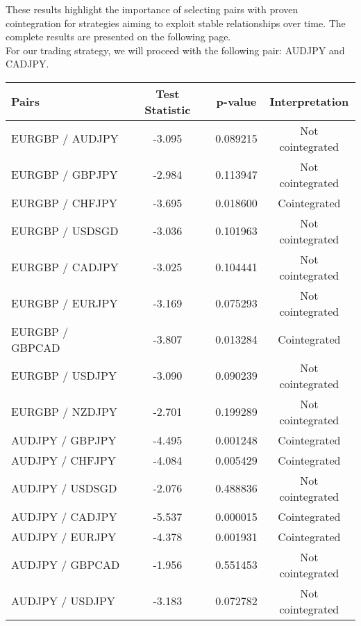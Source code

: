 \documentclass{article}
\begin{document}
These results highlight the importance of selecting pairs with proven cointegration for strategies aiming to exploit stable relationships over time. The complete results are presented on the following page.\\

For our trading strategy, we will proceed with the following pair: AUDJPY and CADJPY.


\begin{table}[h!]
    \centering
    \begin{tabular}{|l|c|c|c|}
        \hline
        \textbf{Pairs} & \textbf{Test Statistic} & \textbf{p-value} & \textbf{Interpretation} \\
        \hline
        EURGBP / AUDJPY & -3.095 & 0.089215 & Not cointegrated \\
        \hline
        EURGBP / GBPJPY & -2.984 & 0.113947 & Not cointegrated \\
        \hline
        EURGBP / CHFJPY & -3.695 & 0.018600 & Cointegrated \\
        \hline
        EURGBP / USDSGD & -3.036 & 0.101963 & Not cointegrated \\
        \hline
        EURGBP / CADJPY & -3.025 & 0.104441 & Not cointegrated \\
        \hline
        EURGBP / EURJPY & -3.169 & 0.075293 & Not cointegrated \\
        \hline
        EURGBP / GBPCAD & -3.807 & 0.013284 & Cointegrated \\
        \hline
        EURGBP / USDJPY & -3.090 & 0.090239 & Not cointegrated \\
        \hline
        EURGBP / NZDJPY & -2.701 & 0.199289 & Not cointegrated \\
        \hline
        AUDJPY / GBPJPY & -4.495 & 0.001248 & Cointegrated \\
        \hline
        AUDJPY / CHFJPY & -4.084 & 0.005429 & Cointegrated \\
        \hline
        AUDJPY / USDSGD & -2.076 & 0.488836 & Not cointegrated \\
        \hline
        AUDJPY / CADJPY & -5.537 & 0.000015 & Cointegrated \\
        \hline
        AUDJPY / EURJPY & -4.378 & 0.001931 & Cointegrated \\
        \hline
        AUDJPY / GBPCAD & -1.956 & 0.551453 & Not cointegrated \\
        \hline
        AUDJPY / USDJPY & -3.183 & 0.072782 & Not cointegrated \\

\end{tabular}
\end{table}
\end{document}
